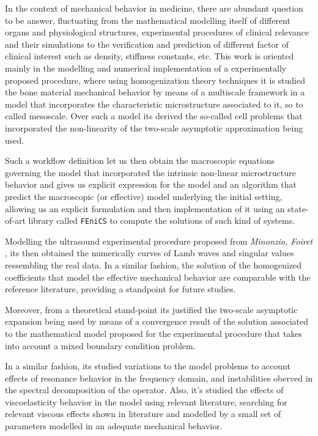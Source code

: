 \begin{intro}
In the context of mechanical behavior in medicine, there are abundant question to be answer, fluctuating from the mathematical modelling itself of different organs and physiological structures, experimental procedures of clinical relevance and their simulations to the verification and prediction of different factor of clinical interest such as density, stiffness constants, etc. 
This work is oriented mainly in the modelling and numerical implementation of a experimentally proposed procedure, where using homogenization theory techniques it is studied the bone material mechanical behavior by means of a multiscale framework in a model that incorporates the characteristic microstructure associated to it, so to called mesoscale.
Over such a model its derived the so-called cell problems that incorporated the non-linearity of the two-scale asymptotic approximation being used.

Such a workflow definition let us then obtain the macroscopic equations governing the model that incorporated the intrinsic non-linear microstructure behavior and gives us explicit expression for the model and an algorithm that predict the macroscopic (or effective) model underlying the initial setting, allowing us an explicit formulation and then implementation of it using an state-of-art library called \texttt{FEniCS} to compute the solutions of such kind of systems.

Modelling the ultrasound experimental procedure proposed from \textit{Minonzio, Foiret} \cite{Foiret2014}, its then obtained the numerically curves of Lamb waves and singular values ressembling the real data. In a similar fashion, the solution of the homogenized coefficients that model the effective mechanical behavior are comparable with the reference literature, providing a standpoint for future studies.

Moreover, from a theoretical stand-point its justified the two-scale asymptotic expansion being used by means of a convergence result of the solution associated to the mathematical model proposed for the experimental procedure that takes into account a mixed boundary condition problem.

In a similar fashion, its studied variations to the model problems to account effects of resonance behavior in the frequency domain, and instabilities oberved in the spectral decomposition of the operator. 
Also, it's studied the effects of viscoelasticity behavior in the model using relevant literature, searching for relevant viscous effects shown in literature and modelled by a small set of parameters modelled in an adequate mechanical behavior.


\end{intro}